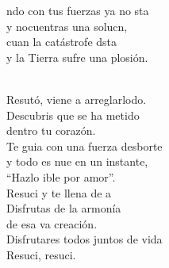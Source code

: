 \begin{cancion}
	ndo con tus fuerzas ya no sta\\
	y nocuentras una solucn,\\
	cuan la catástrofe dsta\\
	y la Tierra sufre una plosión.\\\jump\\
	\begin{chorus}%
	Resutó, viene a arreglarlodo.\\
	Descubris que se ha metido  \\
	dentro tu corazón.\\
	Te guia con una fuerza desborte \\
	y todo es nue en un instante,\\
	“Hazlo ible por amor”.\\
	Resuci y te llena de a \\
	Disfrutas de la armonía  \\
	de esa va creación.\\
	Disfrutares todos juntos de vida\\
	Resuci, resuci. \\
	\end{chorus}%
	\jump\\
\end{cancion}%
